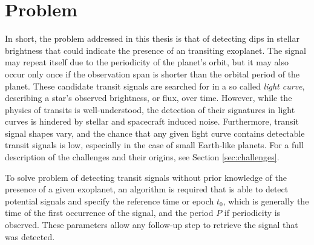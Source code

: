 
\section{Problem}

In short, the problem addressed in this thesis is that of detecting dips in stellar brightness that could indicate the presence of an transiting exoplanet. The signal may repeat itself due to the periodicity of the planet's orbit, but it may also occur only once if the observation span is shorter than the orbital period of the planet. These candidate transit signals are searched for in a so called \textit{light curve}, describing a star's observed brightness, or flux, over time.  However, while the physics of transits is well-understood, the detection of their signatures in light curves is hindered by stellar and spacecraft induced noise. Furthermore, transit signal shapes vary, and the chance that any given light curve contains detectable transit signals is low, especially in the case of small Earth-like planets. For a full description of the challenges and their origins, see Section \ref{sec:challenges}. 

To solve problem of detecting transit signals without prior knowledge of the presence of a given exoplanet, an algorithm is required that is able to detect potential signals and specify the reference time or epoch $t_0$, which is generally the time of the first occurrence of the signal, and the period $P$ if periodicity is observed. These parameters allow any follow-up step to retrieve the signal that was detected.